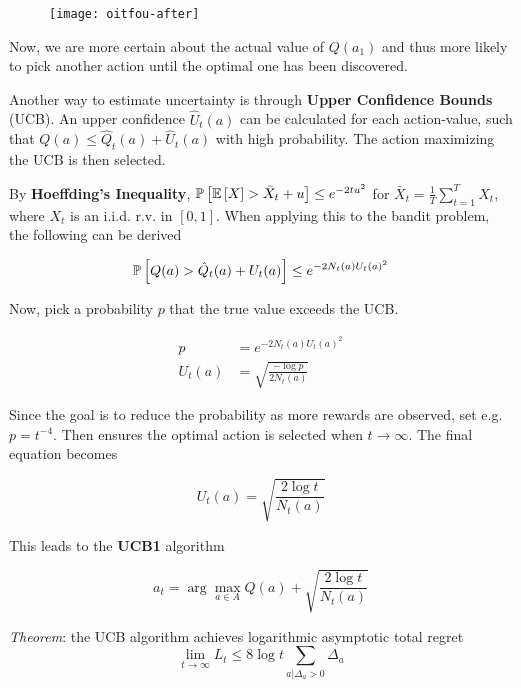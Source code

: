 \begin{figure}[H]
	\centering
	\texttt{[image: oitfou-after]}
\end{figure}

Now, we are more certain about the actual value of $Q(a_1)$ and thus more likely to pick another action until the optimal one has been discovered.

Another way to estimate uncertainty is through \textbf{Upper Confidence Bounds} (UCB). An upper confidence $\hat{U}_t(a)$ can be calculated for each action-value, such that $Q(a) \leq \hat{Q}_t(a) + \hat{U}_t(a)$ with high probability. The action maximizing the UCB is then selected.

By \textbf{Hoeffding's Inequality}, $\operatorname{\mathbb{P}}\left[\operatorname{\mathbb{E}}\left[X\right] > \bar{X}_t + u\right] \leq e^{-2tu^2}$ for $\bar{X}_t = \frac{1}{T} \sum_{t = 1}^T X_t$, where $X_t$ is an i.i.d. r.v. in $[0, 1]$. When applying this to the bandit problem, the following can be derived

\begin{equation*}
	\operatorname{\mathbb{P}}\left[Q(a) > \hat{Q}_t(a) + U_t(a)\right] \leq e^{-2N_t(a)U_t(a)^2}
\end{equation*}

Now, pick a probability $p$ that the true value exceeds the UCB.

\begin{equation*}
	\begin{aligned}
		p & = e^{-2N_t(a)U_t(a)^2}\\
		U_t(a) & = \sqrt{\frac{-\log p}{2 N_t(a)}}
	\end{aligned}
\end{equation*}

Since the goal is to reduce the probability as more rewards are observed, set e.g. $p = t^{-4}$. Then ensures the optimal action is selected when $t \rightarrow \infty$. The final equation becomes

\begin{equation*}
	U_t(a) = \sqrt{\frac{2 \log t}{N_t(a)}}
\end{equation*}

This leads to the \textbf{UCB1} algorithm

\begin{equation*}
	a_t = \arg\max_{a \in A} Q(a) + \sqrt{\frac{2 \log t}{N_t(a)}}
\end{equation*}

\textit{Theorem}: the UCB algorithm achieves logarithmic asymptotic total regret
\begin{equation*}
	\lim_{t \rightarrow \infty} L_t \leq 8 \log t \sum_{a | \Delta_a > 0} \Delta_a
\end{equation*}

